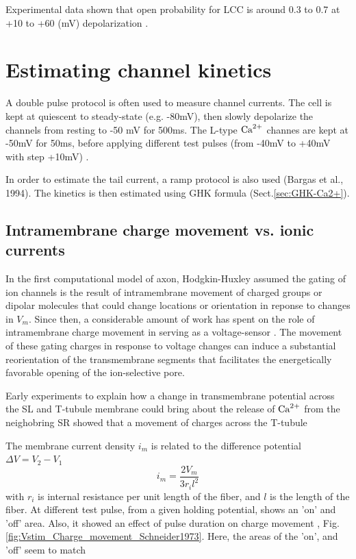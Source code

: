 Experimental data shown that open probability for LCC is around 0.3 to 0.7 at
+10 to +60 (mV) depolarization \citep{cachelin1983}.

\section{Estimating channel kinetics}


A double pulse protocol is often used to measure channel currents. The cell is
kept at quiescent to steady-state (e.g. -80mV), then slowly depolarize the
channels from resting to -50 mV for 500ms. The L-type ${\text{Ca}^{2+}}$ channes are kept at
-50mV for 50ms, before applying different test pulses (from -40mV to +40mV with
step +10mV) \citep{santana1996}. 

In order to estimate the tail current, a ramp protocol is also used (Bargas et
al., 1994). The kinetics is then estimated using GHK formula
(Sect.\ref{sec:GHK-Ca2+}).

\subsection{Intramembrane charge movement vs. ionic currents}

In the first computational model of axon, Hodgkin-Huxley assumed the gating of
ion channels is the result of intramembrane movement of charged groups or
dipolar molecules that could change locations or orientation in reponse to
changes in $V_m$. Since then, a considerable amount of work has spent on the
role of intramembrane charge movement in serving as a voltage-sensor
\citep{Dubois1982, Schneider1973, Ahern2001}. The movement of these gating
charges in response to voltage changes can induce a substantial reorientation of
the transmembrane segments that facilitates the energetically favorable opening
of the ion-selective pore.

 Early experiments to explain how a change in transmembrane potential
across the SL and T-tubule membrane could bring about the release of ${\text{Ca}^{2+}}$ from the
neighobring SR showed that a movement of charges across the T-tubule

The membrane current density $i_m$ is related to the difference potential
$\Delta V = V_2 - V_1$
\begin{equation}
i_m = \frac{2 V_m}{3 r_i l^2}
\end{equation}
with $r_i$ is internal resistance per unit length of the fiber, and $l$ is the
length of the fiber. At different test pulse, from a given holding potential,
shows an 'on' and 'off' area. Also, it showed an effect of pulse duration on
charge movement \citep{Schneider1973},
Fig.\ref{fig:Vstim_Charge_movement_Schneider1973}. Here, the areas of the 'on',
and 'off' seem to match 


